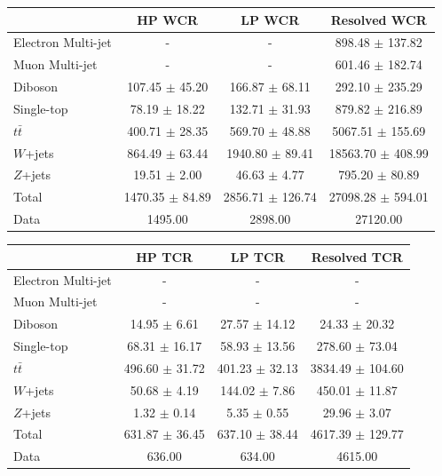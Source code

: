 \begin{table}
\begin{tabular}{|l|c|c|c|}
\hline
	  &	 HP WCR &	 LP WCR &	Resolved WCR \\\hline 
	Electron Multi-jet &	- &	- &	898.48 $\pm$ 137.82 \\\hline 
	Muon Multi-jet &	- &	- &	601.46 $\pm$ 182.74 \\\hline 
	Diboson &	107.45 $\pm$ 45.20 &	166.87 $\pm$ 68.11 &	292.10 $\pm$ 235.29 \\\hline 
	Single-top &	78.19 $\pm$ 18.22 &	132.71 $\pm$ 31.93 &	879.82 $\pm$ 216.89 \\\hline 
	$t\bar{t}$ &	400.71 $\pm$ 28.35 &	569.70 $\pm$ 48.88 &	5067.51 $\pm$ 155.69 \\\hline 
	$W$+jets &	864.49 $\pm$ 63.44 &	1940.80 $\pm$ 89.41 &	18563.70 $\pm$ 408.99 \\\hline 
	$Z$+jets &	19.51 $\pm$ 2.00 &	46.63 $\pm$ 4.77 &	795.20 $\pm$ 80.89 \\\hline 
	Total &	1470.35 $\pm$ 84.89 &	2856.71 $\pm$ 126.74 &	27098.28 $\pm$ 594.01 \\\hline 
	Data &	1495.00 &	2898.00 &	27120.00 \\\hline 
\end{tabular}

\begin{tabular}{|l|c|c|c|}
\hline
	  &	 HP TCR &	 LP TCR &	Resolved TCR \\\hline 
	Electron Multi-jet &	- &	- &	- \\\hline 
	Muon Multi-jet &	- &	- &	- \\\hline 
	Diboson &	14.95 $\pm$ 6.61 &	27.57 $\pm$ 14.12 &	24.33 $\pm$ 20.32 \\\hline 
	Single-top &	68.31 $\pm$ 16.17 &	58.93 $\pm$ 13.56 &	278.60 $\pm$ 73.04 \\\hline 
	$t\bar{t}$ &	496.60 $\pm$ 31.72 &	401.23 $\pm$ 32.13 &	3834.49 $\pm$ 104.60 \\\hline 
	$W$+jets &	50.68 $\pm$ 4.19 &	144.02 $\pm$ 7.86 &	450.01 $\pm$ 11.87 \\\hline 
	$Z$+jets &	1.32 $\pm$ 0.14 &	5.35 $\pm$ 0.55 &	29.96 $\pm$ 3.07 \\\hline 
	Total &	631.87 $\pm$ 36.45 &	637.10 $\pm$ 38.44 &	4617.39 $\pm$ 129.77 \\\hline 
	Data &	636.00 &	634.00 &	4615.00 \\\hline 
\end{tabular}


\end{table}
